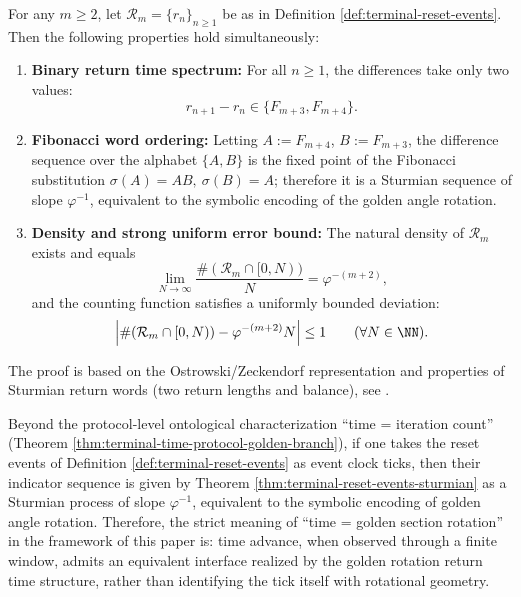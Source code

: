 \begin{enumerate}
  \begin{theorem}\label{thm:terminal-reset-events-sturmian}
  For any \(m\ge 2\), let \(\mathcal R_m=\{r_n\}_{n\ge 1}\) be as in Definition \ref{def:terminal-reset-events}.
  Then the following properties hold simultaneously:
  \begin{enumerate}
    \item \textbf{Binary return time spectrum:} For all \(n\ge 1\), the differences take only two values:
    \[
    r_{n+1}-r_n\in\{F_{m+3},F_{m+4}\}.
    \]
    \item \textbf{Fibonacci word ordering:} Letting \(A:=F_{m+4}\), \(B:=F_{m+3}\), the difference sequence over the alphabet \(\{A,B\}\) is the fixed point of the Fibonacci substitution \(\sigma(A)=AB,\ \sigma(B)=A\); therefore it is a Sturmian sequence of slope \(\varphi^{-1}\), equivalent to the symbolic encoding of the golden angle rotation.
    \item \textbf{Density and strong uniform error bound:} The natural density of \(\mathcal R_m\) exists and equals
    \[
    \lim_{N\to\infty}\frac{\#(\mathcal R_m\cap[0,N))}{N}=\varphi^{-(m+2)},
    \]
    and the counting function satisfies a uniformly bounded deviation:
    \[
    \Bigl|\#(\mathcal R_m\cap[0,N))-\varphi^{-(m+2)}N\Bigr|\le 1\qquad(\forall N\in\NN).
    \]
  \end{enumerate}
  The proof is based on the Ostrowski/Zeckendorf representation and properties of Sturmian return words (two return lengths and balance), see \cite{MorseHedlund1940,LindMarcus1995,Slater1950DistributionIntegers,Slater1967GapsSteps}.
  \end{theorem}
  
  

  \begin{remark}\label{rem:terminal-time-golden-rotation-operational}
  Beyond the protocol-level ontological characterization ``time = iteration count'' (Theorem \ref{thm:terminal-time-protocol-golden-branch}), if one takes the reset events of Definition \ref{def:terminal-reset-events} as event clock ticks, then their indicator sequence is given by Theorem \ref{thm:terminal-reset-events-sturmian} as a Sturmian process of slope \(\varphi^{-1}\), equivalent to the symbolic encoding of golden angle rotation.
  Therefore, the strict meaning of ``time = golden section rotation'' in the framework of this paper is: time advance, when observed through a finite window, admits an equivalent interface realized by the golden rotation return time structure, rather than identifying the tick itself with rotational geometry.
  \end{remark}


\end{enumerate}
